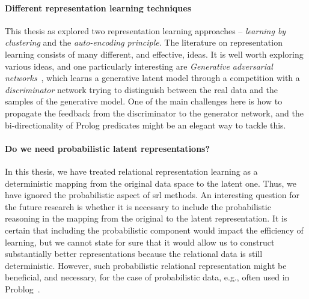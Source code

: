 \paragraph{Different representation learning techniques}
This thesis as explored two representation learning approaches -- \textit{learning by clustering} and the \textit{auto-encoding principle}.
The literature on representation learning consists of many different, and effective, ideas.
It is well worth exploring various ideas, and one particularly interesting are \textit{Generative adversarial networks}~\cite{Goodfellow:2014:GAN:2969033.2969125}, which learns a generative latent model through a competition with a \textit{discriminator} network trying to distinguish between the real data and the samples of the generative model.
One of the main challenges here is how to propagate the feedback from the discriminator to the generator network, and the bi-directionality of Prolog predicates might be an elegant way to tackle this.


\paragraph{Do we need probabilistic latent representations?}
In this thesis, we have treated relational representation learning as a deterministic mapping from the original data space to the latent one.
Thus,  we have ignored the probabilistic aspect of \gls{srl} methods.
An interesting question for the future research is whether it is necessary to include the probabilistic reasoning in the mapping from the original to the latent representation.
It is certain that including the probabilistic component would impact the efficiency of learning, but we cannot state for sure that it would allow us to construct substantially better representations because the relational data is still deterministic.
However, such probabilistic relational representation might be beneficial, and necessary, for the case of probabilistic data, e.g., often used in Problog~\cite{DeRaedt:2007:PPP:1625275.1625673}.




